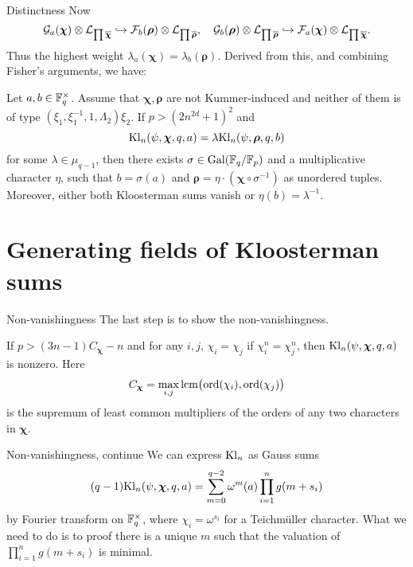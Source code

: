\documentclass[aspectratio=169,handout]{beamer}
\newcommand\bchi{{\boldsymbol\chi}}
\newcommand\brho{{\boldsymbol\rho}}
\begin{document}
\begin{frame}{Distinctness}
Now 
	\[\CG_a(\bchi)\otimes \CL_{\prod \ov\bchi}\inj \CF_b(\brho)\otimes\CL_{\prod\ov \brho},\quad \CG_b(\brho)\otimes \CL_{\prod \ov\brho}\inj \CF_a(\bchi)\otimes\CL_{\prod\ov \bchi}.\]
Thus the highest weight $\lambda_a(\bchi)=\lambda_b(\brho)$.
Derived from this, and combining Fisher's arguments,  we have:
\begin{theorem}[Z.]
Let $a,b\in{\mathbb{F}}_q^\times$.
Assume that $\bchi,\brho$ are not Kummer-induced and neither of them is of type $(\xi_1,\xi_1^{-1},1,\Lambda_2)\xi_2$.
If $p>(2n^{2d}+1)^2$ and 
	\[\Kl_n(\psi,\bchi,q,a)=\lambda\Kl_n(\psi,\brho,q,b)\]
for some $\lambda\in\mu_{q-1}$, then there exists $\sigma\in{\mathrm{Gal}}({\mathbb{F}}_q/{\mathbb{F}}_p)$ and a multiplicative character $\eta$, such that $b=\sigma(a)$ and $\brho=\eta\cdot(\bchi\circ\sigma^{-1})$ as unordered tuples. Moreover, either both Kloosterman sums vanish or $\eta(b)=\lambda^{-1}$.
\end{theorem}
\end{frame}

\section{Generating fields of Kloosterman sums}


\begin{frame}{Non-vanishingness}
The last step is to show the non-vanishingness.
\begin{theorem}
If $p>(3n-1)C_\bchi-n$ and for any $i,j$, $\chi_i=\chi_j$ if $\chi_i^n=\chi_j^n$, then $\Kl_n(\psi,\bchi,q,a)$ is nonzero.
Here 
\begin{equation}
	C_\bchi=\max_{i,j}\lcm\bigl(\ord(\chi_i),\ord(\chi_j)\bigr)
\end{equation}
is the supremum of least common multipliers of the orders of any two characters in $\bchi$.
\end{theorem}

\end{frame}


\begin{frame}{Non-vanishingness, continue}
We can express ${\mathrm{Kl}}_n$ as Gauss sums
	\[(q-1)\Kl_n(\psi,\bchi,q,a)=
	\sum_{m=0}^{q-2}\omega^m(a) \prod_{i=1}^n g(m+s_i)\]
by Fourier transform on ${\mathbb{F}}_q^\times$, where $\chi_i=\omega^{s_i}$ for a Teichm\"uller character.
What we need to do is to proof there is a unique $m$ such that the valuation of $\prod_{i=1}^ng(m+s_i)$ is minimal.

\end{frame}
\end{document}
